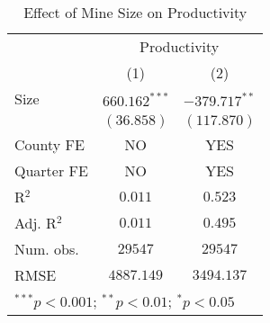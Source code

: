 
\begin{table}[H]
\begin{center}
\begin{tabular}{l c c}
\hline
 & \multicolumn{2}{c}{Productivity} \\
\cline{2-3}
 & (1) & (2) \\
\hline
Size       & $660.162^{***}$ & $-379.717^{**}$ \\
           & $(36.858)$      & $(117.870)$     \\
\hline
County FE  & NO              & YES             \\
Quarter FE & NO              & YES             \\
R$^2$      & $0.011$         & $0.523$         \\
Adj. R$^2$ & $0.011$         & $0.495$         \\
Num. obs.  & $29547$         & $29547$         \\
RMSE       & $4887.149$      & $3494.137$      \\
\hline
\multicolumn{3}{l}{\scriptsize{$^{***}p<0.001$; $^{**}p<0.01$; $^{*}p<0.05$}}
\end{tabular}
\caption{Effect of Mine Size on Productivity}
\label{productivity_size_regs}
\end{center}
\end{table}

